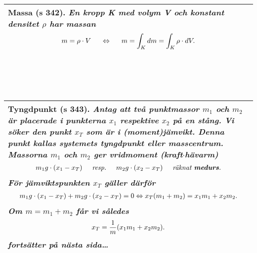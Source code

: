 \documentclass[a4paper]{article}
\begin{document}
\\\\\\
\begin{tabular}{|L{11.5cm}|} \hline
\textbf{Massa} (s 342).
\textit{En kropp K med volym V och \textbf{konstant} densitet $\rho$ har massan}
\begin{equation*}
\begin{array}{>{\displaystyle}c}
m = \rho \cdot V \hspace{0.5cm} \Leftrightarrow \hspace{0.5cm} m=\int_Kdm=\int_{K} \rho \cdot dV.
\end{array}
\end{equation*}
\\\hline
\end{tabular}
\\\\\\
\begin{tabular}{|L{11.5cm}|} \hline
\textbf{Tyngdpunkt} (s 343).
\textit{Antag att två punktmassor $m_1$ och $m_2$ är placerade i punkterna $x_1$ respektive $x_2$ på en stång. Vi söker den punkt $x_T$ som är i (moment)jämvikt. Denna punkt kallas systemets \textbf{tyngdpunkt} eller \textbf{masscentrum}. Massorna $m_1$ och $m_2$ ger \textbf{vridmoment} (kraft$\cdot$hävarm)}
\begin{equation*}
\begin{array}{>{\displaystyle}c}
m_1 g \cdot (x_1-x_T) \hspace{0.5cm} \textit{resp.} \hspace{0.5cm} m_2g\cdot (x_2-x_T) \hspace{0.5cm} \textit{räknat \textbf{medurs}.}
\end{array}
\end{equation*}
\textit{För jämviktspunkten $x_T$ gäller därför}
\begin{equation*}
\begin{array}{>{\displaystyle}c}
m_1 g \cdot (x_1-x_T)+ m_2g\cdot (x_2-x_T) = 0 \Leftrightarrow x_T(m_1+m_2)=x_1m_1 + x_2m_2.
\end{array}
\end{equation*}
\textit{Om $m=m_1+m_2$ får vi således}
\begin{equation*}
\begin{array}{>{\displaystyle}c}
x_T=\frac{1}{m}(x_1m_1+x_2m_2).
\end{array}
\end{equation*}
\textit{fortsätter på nästa sida\ldots}
\\\hline
\end{tabular}
\end{document}
